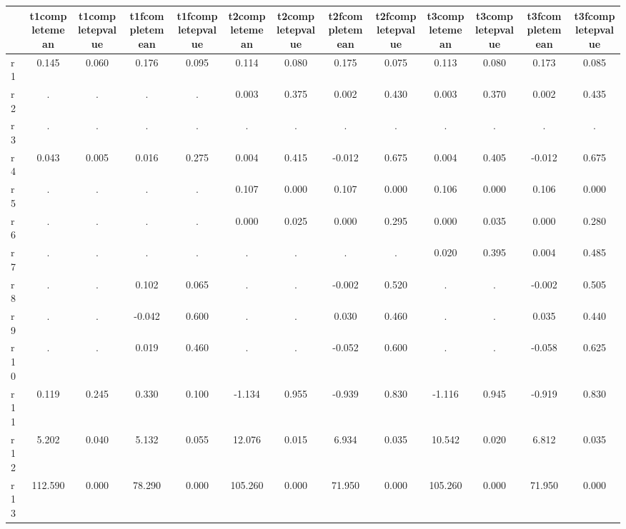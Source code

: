 \begin{table}[htbp]
\begin{tabular}{lcccccccccccc} \hline \hline
 & t1completemean  & t1completepvalue  & t1fcompletemean  & t1fcompletepvalue  & t2completemean  & t2completepvalue  & t2fcompletemean  & t2fcompletepvalue  & t3completemean  & t3completepvalue  & t3fcompletemean  & t3fcompletepvalue  \\  \hline 
r1 &     0.145 &     0.060 &     0.176 &     0.095 &     0.114 &     0.080 &     0.175 &     0.075 &     0.113 &     0.080 &     0.173 &     0.085 \\  
r2 &         . &         . &         . &         . &     0.003 &     0.375 &     0.002 &     0.430 &     0.003 &     0.370 &     0.002 &     0.435 \\  
r3 &         . &         . &         . &         . &         . &         . &         . &         . &         . &         . &         . &         . \\  
r4 &     0.043 &     0.005 &     0.016 &     0.275 &     0.004 &     0.415 &    -0.012 &     0.675 &     0.004 &     0.405 &    -0.012 &     0.675 \\  
r5 &         . &         . &         . &         . &     0.107 &     0.000 &     0.107 &     0.000 &     0.106 &     0.000 &     0.106 &     0.000 \\  
r6 &         . &         . &         . &         . &     0.000 &     0.025 &     0.000 &     0.295 &     0.000 &     0.035 &     0.000 &     0.280 \\  
r7 &         . &         . &         . &         . &         . &         . &         . &         . &     0.020 &     0.395 &     0.004 &     0.485 \\  
r8 &         . &         . &     0.102 &     0.065 &         . &         . &    -0.002 &     0.520 &         . &         . &    -0.002 &     0.505 \\  
r9 &         . &         . &    -0.042 &     0.600 &         . &         . &     0.030 &     0.460 &         . &         . &     0.035 &     0.440 \\  
r10 &         . &         . &     0.019 &     0.460 &         . &         . &    -0.052 &     0.600 &         . &         . &    -0.058 &     0.625 \\  
r11 &     0.119 &     0.245 &     0.330 &     0.100 &    -1.134 &     0.955 &    -0.939 &     0.830 &    -1.116 &     0.945 &    -0.919 &     0.830 \\  
r12 &     5.202 &     0.040 &     5.132 &     0.055 &    12.076 &     0.015 &     6.934 &     0.035 &    10.542 &     0.020 &     6.812 &     0.035 \\  
r13 &   112.590 &     0.000 &    78.290 &     0.000 &   105.260 &     0.000 &    71.950 &     0.000 &   105.260 &     0.000 &    71.950 &     0.000 \\  
\hline \hline \end{tabular}
\end{table}
